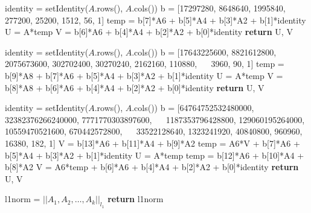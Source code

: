 \begin{algorithm}
	\caption{Pad\'e of Order 7} 
	\begin{algorithmic}[1]
		\State identity = setIdentity($A$.rows(), $A$.cols())
		\State b = [17297280, 8648640, 1995840, 277200, 25200, 1512, 56, 1]
		\State temp = b[7]*A6 + b[5]*A4 + b[3]*A2 + b[1]*identity
		\State U = A*temp
        \State V = b[6]*A6 + b[4]*A4 + b[2]*A2 + b[0]*identity
        \State \textbf{return} U, V
        \EndProcedure
	\end{algorithmic} 
\end{algorithm}

\begin{algorithm}
	\caption{Pad\'e of Order 9} 
	\begin{algorithmic}[1]
		\State identity = setIdentity($A$.rows(), $A$.cols())
		\State b = [17643225600, 8821612800, 2075673600, 302702400, 30270240, 2162160, 110880, \State $\quad$ 3960, 90, 1]
		\State temp = b[9]*A8 + b[7]*A6 + b[5]*A4 + b[3]*A2 + b[1]*identity
		\State U = A*temp
        \State V = b[8]*A8 + b[6]*A6 + b[4]*A4 + b[2]*A2 + b[0]*identity
        \State \textbf{return} U, V
        \EndProcedure
	\end{algorithmic} 
\end{algorithm}

\begin{algorithm}
	\caption{Pad\'e of Order 13} 
	\begin{algorithmic}[1]
		\State identity = setIdentity($A$.rows(), $A$.cols())
		\State b = [64764752532480000, 32382376266240000, 7771770303897600, 
		\State $\quad$ 1187353796428800, 129060195264000, 10559470521600, 670442572800, 
		\State $\quad$ 33522128640, 1323241920, 40840800, 960960, 16380, 182, 1]
		\State V = b[13]*A6 + b[11]*A4 + b[9]*A2
		\State temp = A6*V + b[7]*A6 + b[5]*A4 + b[3]*A2 + b[1]*identity
		\State U = A*temp
		\State temp = b[12]*A6 + b[10]*A4 + b[8]*A2
        \State V = A6*temp + b[6]*A6 + b[4]*A4 + b[2]*A2 + b[0]*identity
        \State \textbf{return} U, V
        \EndProcedure
	\end{algorithmic} 
\end{algorithm}

\begin{algorithm}
	\caption{Normest of Multiple Matrices} 
	\begin{algorithmic}[1]
        \State l1norm = $||A_{1}, A_{2}, \ldots, A_{k}||_{l_{1}}$ 
        \State \textbf{return} l1norm 
        \EndProcedure
	\end{algorithmic} 
\end{algorithm}

